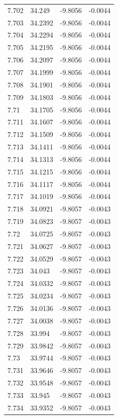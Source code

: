 \begin{tabular}{llll}
7.702 & 34.249 & -9.8056 & -0.0044 \\
7.703 & 34.2392 & -9.8056 & -0.0044 \\
7.704 & 34.2294 & -9.8056 & -0.0044 \\
7.705 & 34.2195 & -9.8056 & -0.0044 \\
7.706 & 34.2097 & -9.8056 & -0.0044 \\
7.707 & 34.1999 & -9.8056 & -0.0044 \\
7.708 & 34.1901 & -9.8056 & -0.0044 \\
7.709 & 34.1803 & -9.8056 & -0.0044 \\
7.71 & 34.1705 & -9.8056 & -0.0044 \\
7.711 & 34.1607 & -9.8056 & -0.0044 \\
7.712 & 34.1509 & -9.8056 & -0.0044 \\
7.713 & 34.1411 & -9.8056 & -0.0044 \\
7.714 & 34.1313 & -9.8056 & -0.0044 \\
7.715 & 34.1215 & -9.8056 & -0.0044 \\
7.716 & 34.1117 & -9.8056 & -0.0044 \\
7.717 & 34.1019 & -9.8056 & -0.0044 \\
7.718 & 34.0921 & -9.8057 & -0.0043 \\
7.719 & 34.0823 & -9.8057 & -0.0043 \\
7.72 & 34.0725 & -9.8057 & -0.0043 \\
7.721 & 34.0627 & -9.8057 & -0.0043 \\
7.722 & 34.0529 & -9.8057 & -0.0043 \\
7.723 & 34.043 & -9.8057 & -0.0043 \\
7.724 & 34.0332 & -9.8057 & -0.0043 \\
7.725 & 34.0234 & -9.8057 & -0.0043 \\
7.726 & 34.0136 & -9.8057 & -0.0043 \\
7.727 & 34.0038 & -9.8057 & -0.0043 \\
7.728 & 33.994 & -9.8057 & -0.0043 \\
7.729 & 33.9842 & -9.8057 & -0.0043 \\
7.73 & 33.9744 & -9.8057 & -0.0043 \\
7.731 & 33.9646 & -9.8057 & -0.0043 \\
7.732 & 33.9548 & -9.8057 & -0.0043 \\
7.733 & 33.945 & -9.8057 & -0.0043 \\
7.734 & 33.9352 & -9.8057 & -0.0043 \\

\end{tabular}
